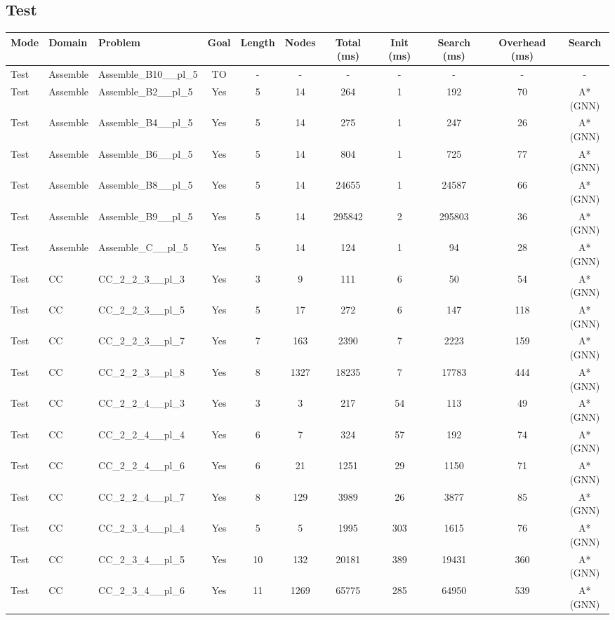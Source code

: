 \documentclass{article}
\begin{document}
\subsection*{Test}
\begin{tabular}{lllcccccccc}
\toprule
Mode & Domain & Problem & Goal & Length & Nodes & Total (ms) & Init (ms) & Search (ms) & Overhead (ms) & Search \\
\midrule
Test & Assemble & Assemble\_B10\_\_pl\_5 & TO & - & - & - & - & - & - & - \\
Test & Assemble & Assemble\_B2\_\_pl\_5 & Yes & 5 & 14 & 264 & 1 & 192 & 70 & A*(GNN) \\
Test & Assemble & Assemble\_B4\_\_pl\_5 & Yes & 5 & 14 & 275 & 1 & 247 & 26 & A*(GNN) \\
Test & Assemble & Assemble\_B6\_\_pl\_5 & Yes & 5 & 14 & 804 & 1 & 725 & 77 & A*(GNN) \\
Test & Assemble & Assemble\_B8\_\_pl\_5 & Yes & 5 & 14 & 24655 & 1 & 24587 & 66 & A*(GNN) \\
Test & Assemble & Assemble\_B9\_\_pl\_5 & Yes & 5 & 14 & 295842 & 2 & 295803 & 36 & A*(GNN) \\
Test & Assemble & Assemble\_C\_\_pl\_5 & Yes & 5 & 14 & 124 & 1 & 94 & 28 & A*(GNN) \\
Test & CC & CC\_2\_2\_3\_\_pl\_3 & Yes & 3 & 9 & 111 & 6 & 50 & 54 & A*(GNN) \\
Test & CC & CC\_2\_2\_3\_\_pl\_5 & Yes & 5 & 17 & 272 & 6 & 147 & 118 & A*(GNN) \\
Test & CC & CC\_2\_2\_3\_\_pl\_7 & Yes & 7 & 163 & 2390 & 7 & 2223 & 159 & A*(GNN) \\
Test & CC & CC\_2\_2\_3\_\_pl\_8 & Yes & 8 & 1327 & 18235 & 7 & 17783 & 444 & A*(GNN) \\
Test & CC & CC\_2\_2\_4\_\_pl\_3 & Yes & 3 & 3 & 217 & 54 & 113 & 49 & A*(GNN) \\
Test & CC & CC\_2\_2\_4\_\_pl\_4 & Yes & 6 & 7 & 324 & 57 & 192 & 74 & A*(GNN) \\
Test & CC & CC\_2\_2\_4\_\_pl\_6 & Yes & 6 & 21 & 1251 & 29 & 1150 & 71 & A*(GNN) \\
Test & CC & CC\_2\_2\_4\_\_pl\_7 & Yes & 8 & 129 & 3989 & 26 & 3877 & 85 & A*(GNN) \\
Test & CC & CC\_2\_3\_4\_\_pl\_4 & Yes & 5 & 5 & 1995 & 303 & 1615 & 76 & A*(GNN) \\
Test & CC & CC\_2\_3\_4\_\_pl\_5 & Yes & 10 & 132 & 20181 & 389 & 19431 & 360 & A*(GNN) \\
Test & CC & CC\_2\_3\_4\_\_pl\_6 & Yes & 11 & 1269 & 65775 & 285 & 64950 & 539 & A*(GNN) \\

\end{tabular}
\end{document}
